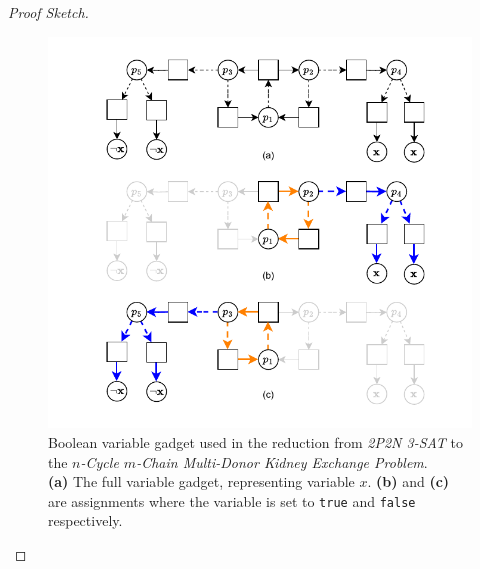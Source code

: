 \begin{lemma}
\begin{proof}[Proof Sketch]
\begin{figure}
    \centering
    \includegraphics{data/sat_reduction_boolean_gadget2.pdf}
    \caption[Boolean variable gadget used in the reduction from \textit{2P2N 3-SAT} to the \textit{$n$-Cycle $m$-Chain Multi-Donor Kidney Exchange Problem}]{Boolean variable gadget used in the reduction from \textit{2P2N 3-SAT} to the \textit{$n$-Cycle $m$-Chain Multi-Donor Kidney Exchange Problem}.\\
    \textbf{(a)} The full variable gadget, representing variable \(x\). \textbf{(b)} and \textbf{(c)} are assignments where the variable is set to \texttt{true} and \texttt{false} respectively.}\label{fig:sat_reduction_boolean_gadget2}
\end{figure}

\end{proof}
\end{lemma}



